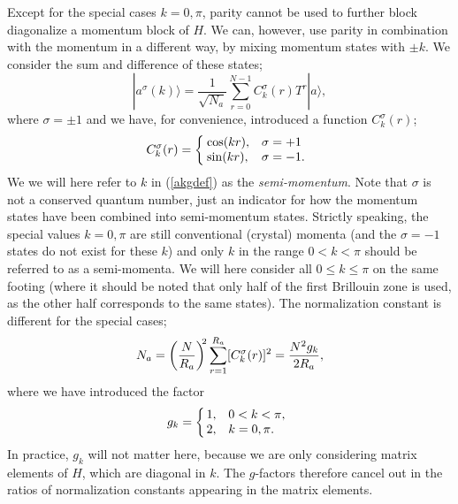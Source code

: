\documentclass[draft,numberedheadings]{aipproc}
\begin{document}
Except for the special cases $k=0,\pi$, parity cannot be used to further block diagonalize a momentum block of $H$. We can, however, use parity in 
combination with the momentum in a different way, by mixing momentum states with $\pm k$. We consider the sum and difference of these states;
\begin{equation}
|a^\sigma (k)\rangle = \frac{1}{\sqrt{N_a}}\sum_{r=0}^{N-1}C^\sigma_k(r)T^r|a\rangle ,
\label{akgdef}
\end{equation}
where $\sigma=\pm 1$ and we have, for convenience, introduced a function $C^\sigma_k(r)$;
\begin{equation}
C_k^\sigma(r) = 
\left \{ \begin{array}{ll}
\hbox{\hskip-1.5mm} \cos(kr), & \sigma=+1  \\
\hbox{\hskip-1.5mm} \sin(kr), & \sigma=-1. \end{array} \right.
\label{cfunc}
\end{equation}
We we will here refer to $k$ in (\ref{akgdef}) as the {\it semi-momentum}. Note that $\sigma$ is not a conserved quantum number, just an indicator
for how the momentum states have been combined into semi-momentum states. Strictly speaking, the special values $k = 0,\pi$ are still conventional 
(crystal) momenta (and the $\sigma=-1$ states do not exist for these $k$) and only $k$ in the range $0 < k < \pi$ should be referred to as a
semi-momenta. We will here consider all $0\le k\le \pi$ on the same footing (where it should be noted that only half of the first Brillouin zone is used, 
as the other half corresponds to the same states). The normalization constant is different for the special cases;
\begin{equation}
N_{a} = \left ( \frac{N}{R_a} \right )^{\hskip-1mm 2} \sum_{r=1}^{R_a} [C^\sigma_k(r)]^2 = \frac{N^2g_k}{2R_a},
\label{normsemi}
\end{equation}
where we have introduced the factor 
\begin{equation}
g_k = \left \lbrace \begin{array}{ll}
\hskip-1.2mm 1, & 0 < k < \pi, \\
\hskip-1.2mm 2, & k = 0,\pi .
\end{array} \right.
\label{gfactor}
\end{equation}
In practice, $g_k$ will not matter here, because we are only considering matrix elements of $H$, which are diagonal in $k$. The $g$-factors 
therefore cancel out in the ratios of normalization constants appearing in the matrix elements.
\end{document}
